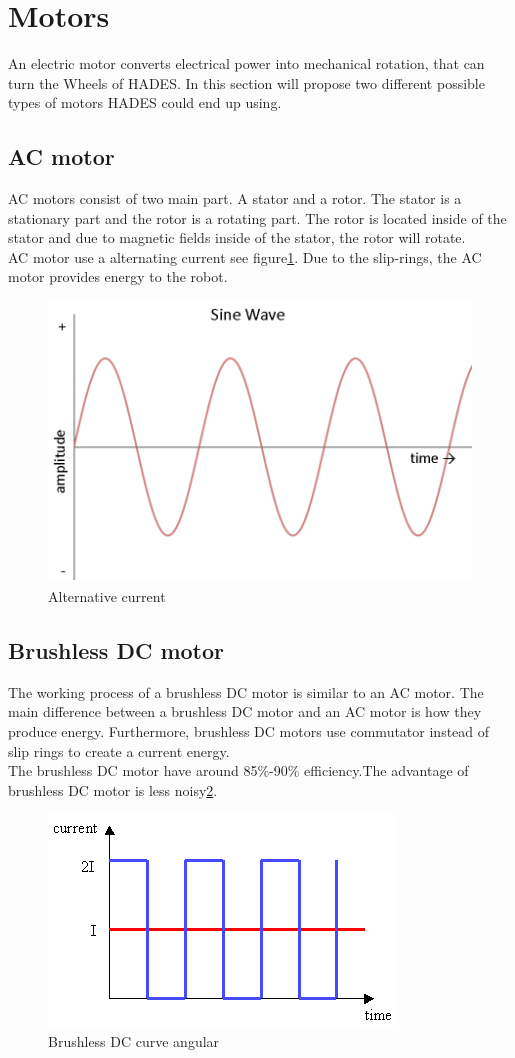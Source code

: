 \section{Motors}
An electric motor converts electrical power into mechanical rotation, that can turn the Wheels of HADES.
In this section will propose two different possible types of motors HADES could end up using.

\subsection{AC motor}
AC motors consist of two main part. A stator and a rotor. The stator is a stationary part and the rotor is a rotating part. The rotor is located inside of the stator and due to magnetic fields inside of the stator, the rotor will rotate\cite{motor21}.\\ 
AC motor use a alternating current see figure\ref{fig:ACmotor}. Due to the slip-rings, the AC motor provides energy to the robot\cite{motor21}.

\begin{figure}[h]
    \centering
    \includegraphics[width=.6\linewidth]{figures/wave.png}
    \caption{Alternative current\cite{ACmotor3}}
    \label{fig:ACmotor}
\end{figure}

\subsection{Brushless DC motor}
The working process of a brushless DC motor is similar to an AC motor. The main difference between a brushless DC motor and an AC motor is how they produce energy. Furthermore, brushless DC motors use commutator instead of slip rings to create a current energy.\\ 
The brushless DC motor have around 85\%-90\% efficiency.The advantage of brushless DC motor is less noisy\ref{fig:DCmotor}\cite{DCbrusshles}.

\begin{figure}[h]
    \centering    \includegraphics[width=.6\linewidth]{figures/dcMotor.png}
    \caption{Brushless DC curve angular\cite{Graphdd}}
    \label{fig:DCmotor}
\end{figure}


